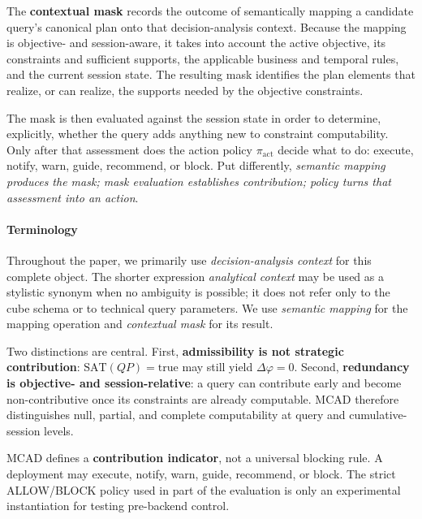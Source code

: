 \documentclass[journal]{IEEEtran}
\begin{document}
The \textbf{contextual mask} records the outcome of semantically mapping a candidate query's canonical plan onto that decision-analysis context. Because the mapping is objective- and session-aware, it takes into account the active objective, its constraints and sufficient supports, the applicable business and temporal rules, and the current session state. The resulting mask identifies the plan elements that realize, or can realize, the supports needed by the objective constraints.

The mask is then evaluated against the session state in order to determine, explicitly, whether the query adds anything new to constraint computability. Only after that assessment does the action policy $\pi_{\mathrm{act}}$ decide what to do: execute, notify, warn, guide, recommend, or block. Put differently, \emph{semantic mapping produces the mask; mask evaluation establishes contribution; policy turns that assessment into an action}.

\paragraph*{Terminology} Throughout the paper, we primarily use \emph{decision-analysis context} for this complete object. The shorter expression \emph{analytical context} may be used as a stylistic synonym when no ambiguity is possible; it does not refer only to the cube schema or to technical query parameters. We use \emph{semantic mapping} for the mapping operation and \emph{contextual mask} for its result.

Two distinctions are central. First, \textbf{admissibility is not strategic contribution}: $\mathrm{SAT}(QP)=\mathrm{true}$ may still yield $\Delta\varphi=0$. Second, \textbf{redundancy is objective- and session-relative}: a query can contribute early and become non-contributive once its constraints are already computable. MCAD therefore distinguishes null, partial, and complete computability at query and cumulative-session levels.

MCAD defines a \textbf{contribution indicator}, not a universal blocking rule. A deployment may execute, notify, warn, guide, recommend, or block. The strict ALLOW/BLOCK policy used in part of the evaluation is only an experimental instantiation for testing pre-backend control.
\end{document}
